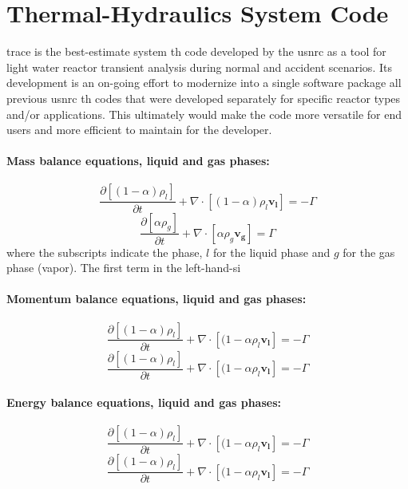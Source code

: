 \section{Thermal-Hydraulics System Code }\label{sec:reflood_trace}

\gls{trace} is the best-estimate system \gls{th} code developed by the \gls{usnrc} 
as a tool for light water reactor transient analysis during normal and accident scenarios.
Its development is an on-going effort 
to modernize into a single software package all previous \gls{usnrc} \gls{th} codes
that were developed separately for specific reactor types and/or applications.
This ultimately would make the code more versatile for end users and more efficient to maintain for the developer.

\paragraph{Mass balance equations, liquid and gas phases:}
\begin{equation}
	\frac{\partial [(1-\alpha)\rho_l]}{\partial t} + \nabla \cdot [(1-\alpha) \rho_l \mathbf{v_l}] = - \Gamma
\label{eq:mass_balance_liquid}
\end{equation}
\begin{equation}
	\frac{\partial [\alpha \rho_g]}{\partial t} + \nabla \cdot [\alpha \rho_g \mathbf{v_g}] = \Gamma
\label{eq:mass_balance_gas}
\end{equation}
where the subscripts indicate the phase, $l$ for the liquid phase and $g$ for the gas phase (vapor).
The first term in the left-hand-si

\paragraph{Momentum balance equations, liquid and gas phases:}
\begin{equation}
	\frac{\partial [(1-\alpha)\rho_l]}{\partial t} + \nabla \cdot [(1-\alpha \rho_l \mathbf{v_l}] = - \Gamma
\label{eq:}
\end{equation}
\begin{equation}
	\frac{\partial [(1-\alpha)\rho_l]}{\partial t} + \nabla \cdot [(1-\alpha \rho_l \mathbf{v_l}] = - \Gamma
\label{eq:}
\end{equation}

\paragraph{Energy balance equations, liquid and gas phases:}
\begin{equation}
	\frac{\partial [(1-\alpha)\rho_l]}{\partial t} + \nabla \cdot [(1-\alpha \rho_l \mathbf{v_l}] = - \Gamma
\label{eq:}
\end{equation}
\begin{equation}
	\frac{\partial [(1-\alpha)\rho_l]}{\partial t} + \nabla \cdot [(1-\alpha \rho_l \mathbf{v_l}] = - \Gamma
\label{eq:}
\end{equation}